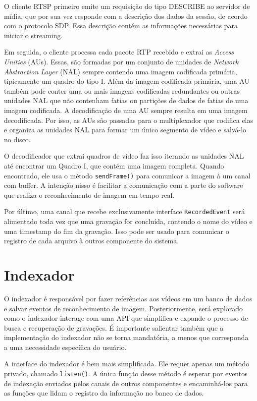 \documentclass[12pt, %
openright, 
oneside, %
a4paper,    %
brazil]{facom-ufu-abntex2}
\begin{document}
O cliente RTSP primeiro emite um requisição do tipo DESCRIBE ao servidor de
mídia, que por sua vez responde com a descrição dos dados da sessão, de acordo
com o protocolo SDP. Essa descrição contém as informações necessárias para
iniciar o streaming.

Em seguida, o cliente processa cada pacote RTP recebido e extrai as
\textit{Access Unities} (AUs). Essas, são formadas por um conjunto de unidades
de \textit{Network Abstraction Layer} (NAL) sempre contendo uma imagem
codificada primária, tipicamente um quadro do tipo I. Além da imagem codificada
primária, uma AU também pode conter uma ou mais imagens codificadas redundantes
ou outras unidades NAL que não contenham fatias ou partições de dados de fatias
de uma imagem codificada. A decodificação de uma AU sempre resulta em uma
imagem decodificada. Por isso, as AUs são passadas para o multiplexador que
codifica elas e organiza as unidades NAL para formar um único segmento de vídeo
e salvá-lo no disco.

O decodificador que extrai quadros de vídeo faz isso iterando as unidades NAL
até encontrar um Quadro I, que contém uma imagem completa. Quando encontrado,
ele usa o método \texttt{sendFrame()} para comunicar a imagem à um
canal com buffer. A intenção nisso é facilitar a comunicação com a parte do
software que realiza o reconhecimento de imagem em tempo real.

Por último, uma canal que recebe exclusivamente interface
\texttt{RecordedEvent} será alimentado toda vez que uma gravação for
concluída, contendo o nome do vídeo e uma timestamp do fim da gravação. Isso
pode ser usado para comunicar o registro de cada arquivo à outros componente do
sistema.

\section{Indexador}

O indexador é responsável por fazer referências aos vídeos em um banco de dados
e salvar eventos de reconhecimento de imagem. Posteriormente, será explorado
como o indexador interage com uma API que simplifica e expande o processo de
busca e recuperação de gravações. É importante salientar também que a
implementação do indexador não se torna mandatória, a menos que corresponda a
uma necessidade específica do usuário.

A interface do indexador é bem mais simplificada. Ele requer apenas um método
privado, chamado \texttt{listen()}. A única função desse método é
esperar por eventos de indexação enviados pelos canais de outros componentes e
encaminhá-los para as funções que lidam o registro da informação no banco de
dados.
\end{document}
